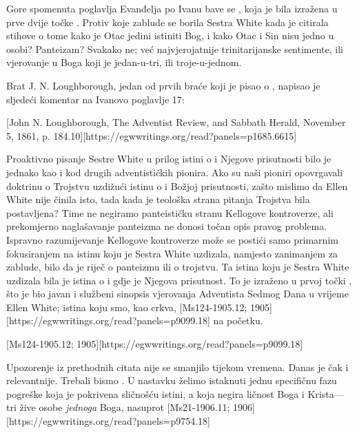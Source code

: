 Gore spomenuta poglavlja Evanđelja po Ivanu bave se , koja je bila izražena u prve dvije točke . Protiv koje zablude se borila Sestra White kada je citirala stihove o tome kako je Otac jedini istiniti Bog, i kako Otac i Sin nisu jedno u osobi? Panteizam? Svakako ne; već najvjerojatnije trinitarijanske sentimente, ili vjerovanje u Boga koji je jedan-u-tri, ili troje-u-jednom.

Brat J. N. Loughborough, jedan od prvih braće koji je pisao o , napisao je sljedeći komentar na Ivanovo poglavlje 17:

[John N. Loughborough, The Adventist Review, and Sabbath Herald, November 5, 1861, p. 184.10][https://egwwritings.org/read?panels=p1685.6615]

Proaktivno pisanje Sestre White u prilog istini o  i Njegove prisutnosti bilo je jednako kao i kod drugih adventističkih pionira. Ako su naši pioniri opovrgavali doktrinu o Trojstvu uzdižući istinu o  i Božjoj prisutnosti, zašto mislimo da Ellen White nije činila isto, tada kada je teološka strana pitanja Trojstva bila postavljena? Time ne negiramo panteističku stranu Kellogove kontroverze, ali prekomjerno naglašavanje panteizma ne donosi točan opis pravog problema. Ispravno razumijevanje Kellogove kontroverze može se postići samo primarnim fokusiranjem na istinu koju je Sestra White uzdizala, namjesto zanimanjem za zablude, bilo da je riječ o panteizmu ili o trojstvu. Ta istina koju je Sestra White uzdizala bila je istina o  i gdje je Njegova prisutnost. To je izraženo u prvoj točki , što je bio javan i službeni sinopsis vjerovanja Adventista Sedmog Dana u vrijeme Ellen White; istina koju smo, kao crkva, [Ms124-1905.12; 1905][https://egwwritings.org/read?panels=p9099.18] na početku.

[Ms124-1905.12; 1905][https://egwwritings.org/read?panels=p9099.18]

Upozorenje iz prethodnih citata nije se smanjilo tijekom vremena. Danas je čak i relevantnije. Trebali bismo . U nastavku želimo istaknuti jednu specifičnu fazu pogreške koja je pokrivena sličnošću istini, a koja negira ličnost Boga i Krista—tri žive osobe \textit{jednoga} Boga, nasuprot [Ms21-1906.11; 1906][https://egwwritings.org/read?panels=p9754.18]
